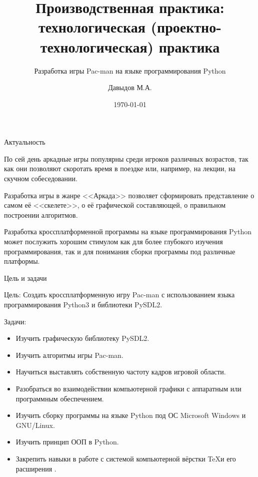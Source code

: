 \documentclass[10pt,a4paper,mathserif]{beamer}
\title{Производственная практика: технологическая (проектно-технологическая) практика}
\subtitle{Разработка игры Pac-man на языке программирования Python}
\author{Давыдов М.А.}
\institute{группа 5.205-1}
\date{\today}
\begin{document}
\begin{frame}
\maketitle
\end{frame}

\begin{frame}{Актуальность}
    \begin{block}{}
    По сей день аркадные игры популярны среди игроков различных возрастов, так как они позволяют скоротать время в поездке или, например, на лекции, на скучном собеседовании.
    \end{block}

    \begin{block}{}
    Разработка игры в жанре <<Аркада>> позволяет сформировать представление о самом её <<скелете>>, о её графической составляющей, о правильном построении алгоритмов.
    \end{block}

    \begin{block}{}
    Разработка кроссплатформенной программы на языке программирования Python может послужить хорошим стимулом как для более глубокого изучения программирования, так и для понимания сборки программы под различные платформы.
    \end{block}
\end{frame}

\begin{frame}{Цель и задачи}
    \begin{block}{Цель:}
        \small{Создать кроссплатформенную игру Pac-man с использованием языка программирования Python3 и библиотеки PySDL2.}
    \end{block}

    \begin{block}{Задачи:}
        \begin{itemize}
            \item \small{Изучить графическую библиотеку PySDL2.}
            \item \small{Изучить алгоритмы игры Pac-man.}
            \item \small{Научиться выставлять собственную частоту кадров игровой области.}
        	\item \small{Разобраться во взаимодействии компьютерной графики с аппаратным или программным обеспечением.}
        	\item \small{Изучить сборку программы на языке Python под ОС Microsoft Windows и GNU/Linux.}
        	\item \small{Изучить принцип ООП в Python.}
        	\item \small{Закрепить навыки в работе с системой компьютерной вёрстки \TeX и его расширения \XeTeX.}
        \end{itemize}
    \end{block}

\end{frame}
\end{document}
